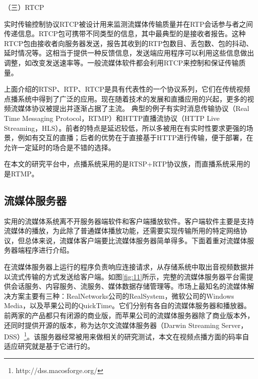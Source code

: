 （三）RTCP

实时传输控制协议RTCP被设计用来监测流媒体传输质量并在RTP会话参与者之间传递信息。RTCP包可携带不同类型的信息，其中最典型的是接收者报告。这种RTCP包由接收者向服务器发送，报告其收到的RTP包数目、丢包数、包的抖动、延时情况等。这相当于提供一种反馈信息，发送端应用程序可以利用这些信息做出调整，如改变发送速率等。一般流媒体软件都会利用RTCP来控制和保证传输质量。

上面介绍的RTSP、RTP、RTCP是具有代表性的一个协议系列，它们在传统视频点播系统中得到了广泛的应用。现在随着技术的发展和直播应用的兴起，更多的视频流媒体协议被提出并逐渐占据了主流。
典型的例子有实时消息传输协议（Real Time Messaging Protocol，RTMP）和HTTP直播流协议（HTTP Live Streaming，HLS）。前者的特点是延迟较低，所以多被用在有实时性要求更强的场景，例如有交互的直播；后者的优势在于直接基于HTTP进行传输，便于部署，在允许一定延时的场合是不错的选择。

在本文的研究平台中，点播系统采用的是RTSP+RTP协议族，而直播系统采用的是RTMP。

\subsection{流媒体服务器}

实用的流媒体系统离不开服务器端软件和客户端播放软件。客户端软件主要是支持流媒体的播放，为此除了普通媒体播放功能，还需要实现传输所用的特定网络协议，但总体来说，流媒体客户端要比流媒体服务器简单得多。下面着重对流媒体服务器端程序进行介绍。

在流媒体服务器上运行的程序负责响应连接请求，从存储系统中取出音视频数据并以流式传输的方式发送给客户端。如图\ref{fig:11}所示，完整的流媒体服务器平台需提供会话服务、内容服务、流服务、媒体数据存储管理等。市场上最知名的流媒体解决方案主要有三种：RealNetworks公司的RealSystem，微软公司的Windows Media，以及苹果公司的QuickTime。它们分别有各自的流媒体服务器和播放器。前两家的产品都只有闭源的商业版，而苹果公司的流媒体服务器除了商业版本外，还同时提供开源的版本，称为达尔文流媒体服务器（Darwin Streaming Server，DSS）\footnote{http://dss.macosforge.org/}。该服务器经常被用来做相关的研究测试\supercite{Huang2004}，本文在视频点播方面的码率自适应研究就是基于它进行的。

